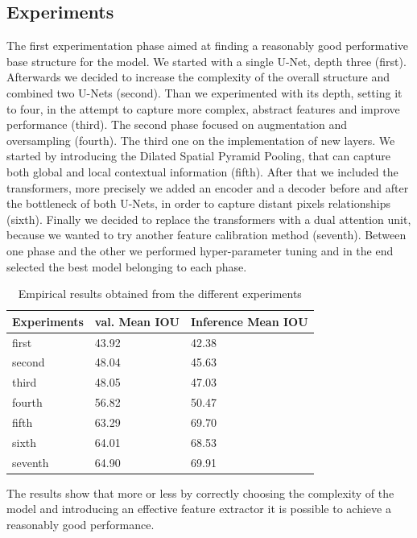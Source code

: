 \documentclass[11pt]{article}
\begin{document}
\begin{multicols}{2}
        \section{Experiments}
        The first experimentation phase aimed at finding a reasonably good performative base structure for the model. We started with a single U-Net, depth three (first). Afterwards we decided to increase the complexity of the overall structure and combined two U-Nets (second). Than we experimented with its depth, setting it to four, in the attempt to capture more complex, abstract features and improve performance (third). 
        The second phase focused on augmentation and oversampling (fourth).
        The third one on the implementation of new layers. We started by introducing the Dilated Spatial Pyramid Pooling, that can capture both global and local contextual information (fifth). After that we included the transformers, more precisely we added an encoder and a decoder before and after the bottleneck of both U-Nets, in order to capture distant pixels relationships (sixth). Finally we decided to replace the transformers with a dual attention unit, because we wanted to try another feature calibration method (seventh). Between one phase and the other we performed hyper-parameter tuning and in the end selected the best model belonging to each phase.
        \begin{table}[H]
            \centering
            \setlength{\tabcolsep}{3pt}
            \caption{Empirical results obtained from the different experiments}
            \begin{tabularx}{\linewidth}{lYY}
                \toprule
                 Experiments & val. Mean IOU & Inference Mean IOU\\
                \midrule
                first  & 43.92 & 42.38\\
                second  & 48.04 & 45.63\\
                third  & 48.05 & 47.03\\
                fourth  & 56.82 & 50.47\\
                fifth  & 63.29 & 69.70\\
                sixth  & 64.01 & 68.53\\
                seventh  & 64.90 & 69.91\\
               
                \bottomrule
            \end{tabularx}
            \label{tb:Measurements}
        \end{table}
        The results show that more or less by correctly choosing the complexity of the model and introducing an effective feature extractor it is possible to achieve a reasonably good performance.
        \\
        


\end{multicols}
\end{document}
